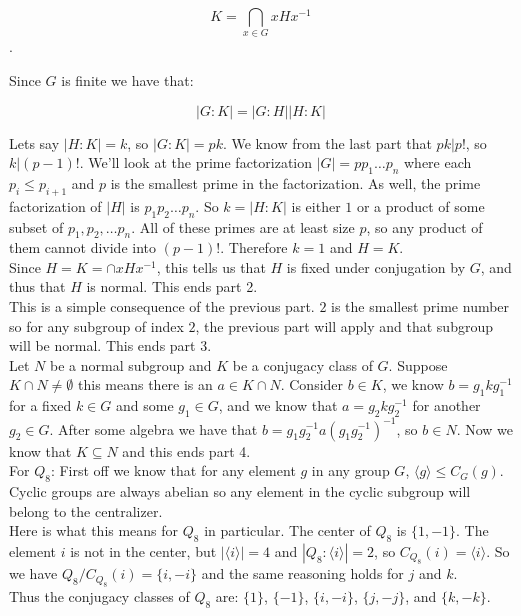 \documentclass[12pt]{report}
\begin{document}
$$K = \bigcap_{x \in G} xHx^{-1}$$.

Since $G$ is finite we have that:

$$|G:K| = |G:H||H:K|$$

Lets say $|H:K| = k$, so $|G:K| = pk$. We know from the last part that $pk|
p!$, so $k | (p-1)!$. We'll look at the prime factorization $|G| = pp_1
\dots p_n$ where each $p_i \leq p_{i+1}$ and $p$ is the smallest prime in
the factorization. As well, the prime factorization of $|H|$ is $p_1p_2
\dots p_n$. So $k = |H:K|$ is either $1$ or a product of some subset of $p_1
,p_2,\dots p_n$. All of these primes are at least size $p$, so any product
of them cannot divide into $(p-1)!$. Therefore $k = 1$ and $H = K$.\\

Since $H = K = \cap xHx^{-1}$, this tells us that $H$ is fixed
under conjugation by $G$, and thus that $H$ is normal. This ends part 2. \\

 This is a simple consequence of the previous part.
$2$ is the smallest prime number so for any subgroup of index $2$, the
previous part will apply and that subgroup will be normal. This ends part
3.\\

 Let $N$ be a normal subgroup and $K$ be a conjugacy
class of $G$. Suppose $K \cap N \neq \emptyset$ this means there is an $a
\in K \cap N$. Consider $b \in K$, we know $b = g_1kg_1^{-1}$ for a fixed $k
\in G$ and some $g_1 \in G$, and we know that $a= g_2kg_2^{-1}$ for another
$g_2\in G$. After some algebra we have that $b = g_1 g_2^{-1} a
(g_1g_2^{-1})^{-1}$, so $b \in N$. Now we know that $K \subseteq N$ and this
ends part 4.\\

 For $Q_8$: First off we know that for any element
$g$ in any group $G$, $\langle g \rangle \leq C_G(g)$. Cyclic groups are
always abelian so any element in the cyclic subgroup will belong to the
centralizer.\\

Here is what this means for $Q_8$ in particular. The center of $Q_8$ is $\{ 1,
-1\}$. The element $i$ is not in the center, but $|\langle i \rangle| = 4$ and
$|Q_8 : \langle i \rangle| = 2$, so $C_{Q_8}(i) = \langle i \rangle$. So we have
$Q_8/C_{Q_8}(i) = \{ i, -i\}$ and the same reasoning holds for $j$ and $k$.\\

Thus the conjugacy classes of $Q_8$ are: $\{ 1\}$, $\{-1\}$, $\{ i, -i\} $, $\{
j, -j\}$, and $\{ k, -k\}$.\\
\end{document}
